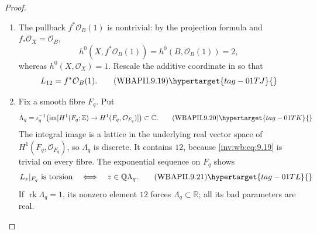 \begin{proof}

\begin{enumerate}[label={$\langle1\rangle$\arabic*.},leftmargin=*]
\item The pullback \(f^*\mathcal O_B(1)\) is nontrivial: by the projection
formula and \(f_*\mathcal O_X=\mathcal O_B\),
\[
 h^0(X,f^*\mathcal O_B(1))=h^0(B,\mathcal O_B(1))=2,
\]
whereas \(h^0(X,\mathcal O_X)=1\).  Rescale the additive coordinate in
 so that
\[
 L_{12}=f^*\mathcal O_B(1).
\tag{WBAPII.9.19}\hypertarget{tag-01TJ}{}\label{inv:wb:eq:9.19}
\]

\item Fix a smooth fibre \(F_q\).  Put
\[
 \Lambda_q=\iota_q^{-1}\!\left(
 \operatorname{im}[H^1(F_q;\mathbb Z)\to
 H^1(F_q,\mathcal O_{F_q})]\right)\subset\mathbb C.
\tag{WBAPII.9.20}\hypertarget{tag-01TK}{}\label{inv:wb:eq:9.20}
\]
The integral image is a lattice in the underlying real vector space of
\(H^1(F_q,\mathcal O_{F_q})\), so \(\Lambda_q\) is discrete.  It contains
\(12\), because \eqref{inv:wb:eq:9.19} is trivial on every fibre.  The exponential
sequence on \(F_q\) shows
\[
 L_z|_{F_q}\text{ is torsion}
 \quad\Longleftrightarrow\quad z\in\mathbb Q\Lambda_q.
\tag{WBAPII.9.21}\hypertarget{tag-01TL}{}\label{inv:wb:eq:9.21}
\]
If \(\operatorname{rk}\Lambda_q=1\), its nonzero element \(12\) forces
\(\Lambda_q\subset\mathbb R\); all its bad parameters are real.


\end{enumerate}
\end{proof}
